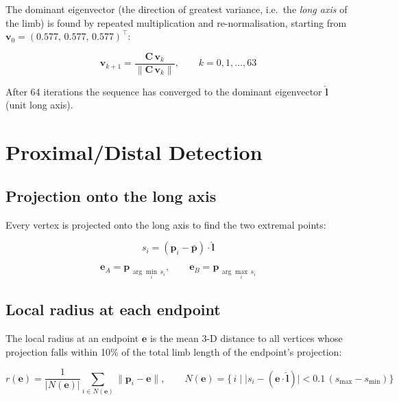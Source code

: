 \documentclass[11pt, a4paper]{article}
\begin{document}
The dominant eigenvector (the direction of greatest variance, i.e.\ the
\emph{long axis} of the limb) is found by repeated multiplication and
re-normalisation, starting from $\bm{v}_0 = (0.577,\, 0.577,\, 0.577)^\top$:

\begin{equation}
  \bm{v}_{k+1} = \frac{\bm{C}\,\bm{v}_k}{\|\bm{C}\,\bm{v}_k\|},
  \qquad k = 0, 1, \ldots, 63
\end{equation}

After 64 iterations the sequence has converged to the dominant eigenvector
$\hat{\bm{l}}$ (unit long axis).

\section{Proximal/Distal Detection}

\subsection{Projection onto the long axis}

Every vertex is projected onto the long axis to find the two extremal points:

\begin{equation}
  s_i = (\bm{p}_i - \bar{\bm{p}}) \cdot \hat{\bm{l}}
\end{equation}

\begin{equation}
  \bm{e}_A = \bm{p}_{\,\arg\min_i\, s_i},
  \qquad
  \bm{e}_B = \bm{p}_{\,\arg\max_i\, s_i}
\end{equation}

\subsection{Local radius at each endpoint}

The local radius at an endpoint $\bm{e}$ is the mean 3-D distance to all
vertices whose projection falls within 10\% of the total limb length of the
endpoint's projection:

\begin{equation}
  r(\bm{e}) = \frac{1}{|N(\bm{e})|}
              \sum_{i \in N(\bm{e})} \|\bm{p}_i - \bm{e}\|,
  \qquad
  N(\bm{e}) = \bigl\{\, i \;\big|\;
    \bigl| s_i - (\bm{e} \cdot \hat{\bm{l}}) \bigr| < 0.1\,(s_{\max} - s_{\min})
  \bigr\}
\end{equation}
\end{document}
